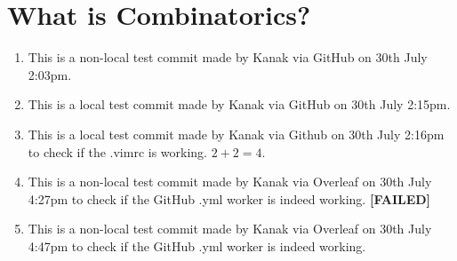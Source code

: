 %
%
% 


\chapter{What is Combinatorics?}
\begin{enumerate}
\item This is a non-local test commit made by Kanak via GitHub on 30th July 2:03pm. 
\item This is a local test commit made by Kanak via GitHub on 30th July 2:15pm.
\item This is a local test commit made by Kanak via Github on 30th July 2:16pm to check if the .vimrc is working. $2+2=4$.
\item This is a non-local test commit made by Kanak via Overleaf on 30th July 4:27pm to check if the GitHub .yml worker is indeed working. \textbf{[FAILED]}
\item This is a non-local test commit made by Kanak via Overleaf on 30th July 4:47pm to check if the GitHub .yml worker is indeed working. 
\end{enumerate}















\endinput


